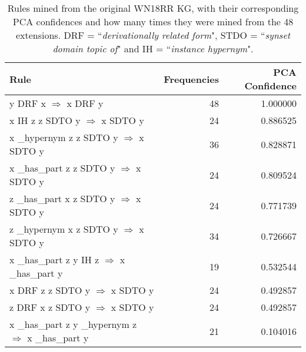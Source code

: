 \begin{table}
\begin{tabular}{lrr}
\toprule
                                                                                                      Rule &  Frequencies &  PCA Confidence \\
\midrule
                            y  DRF  x   $\Rightarrow$ x  DRF  y &           48 &        1.000000 \\
          x  IH  z  z  SDTO  y   $\Rightarrow$ x  SDTO  y &           24 &        0.886525 \\
                   x  \_hypernym  z  z  SDTO  y   $\Rightarrow$ x  SDTO  y &           36 &        0.828871 \\
                   x  \_has\_part  z  z  SDTO  y   $\Rightarrow$ x  SDTO  y &           24 &        0.809524 \\
                   z  \_has\_part  x  z  SDTO  y   $\Rightarrow$ x  SDTO  y &           24 &        0.771739 \\
                   z  \_hypernym  x  z  SDTO  y   $\Rightarrow$ x  SDTO  y &           34 &        0.726667 \\
                                      x  \_has\_part  z  y  IH  z   $\Rightarrow$ x  \_has\_part  y &           19 &        0.532544 \\
x  DRF  z  z  SDTO  y   $\Rightarrow$ x  SDTO  y &           24 &        0.492857 \\
z  DRF  x  z  SDTO  y   $\Rightarrow$ x  SDTO  y &           24 &        0.492857 \\
                                               x  \_has\_part  z  y  \_hypernym  z   $\Rightarrow$ x  \_has\_part  y &           21 &        0.104016 \\
\bottomrule
\end{tabular}
\caption{Rules mined from the original WN18RR KG, with their corresponding PCA confidences and how many times they were mined from the 48 extensions. DRF = ``\textit{derivationally related form}", STDO = ``\textit{synset domain topic of}" and IH = ``\textit{instance hypernym}".}
\label{wn18rr_original_rules_table_PCA}
\end{table}

